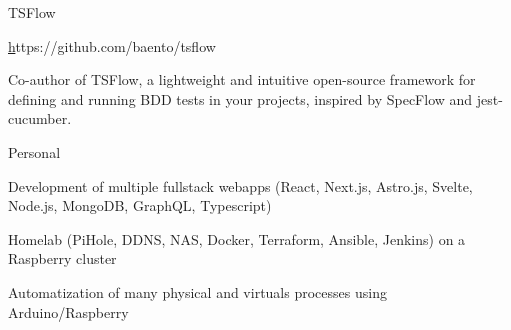
\begin{cventries}
    \cventrywithouttitleanddate
    {TSFlow} %
    {} %
    {
      \begin{cvitems} %
        \item {\href{https://github.com/baento/tsflow}https://github.com/baento/tsflow}
        \item {Co-author of TSFlow, a lightweight and intuitive open-source framework for defining and running BDD tests in your projects, inspired by SpecFlow and jest-cucumber.}
      \end{cvitems}
    }

  \cventry
    {} %
    {Personal} %
    {} %
    {} %
    {
      \begin{cvitems} %
        \item {Development of multiple fullstack webapps (React, Next.js, Astro.js, Svelte, Node.js, MongoDB, GraphQL, Typescript)}
        \item {Homelab (PiHole, DDNS, NAS, Docker, Terraform, Ansible, Jenkins) on a Raspberry cluster}
		\item {Automatization of many physical and virtuals processes using Arduino/Raspberry}
      \end{cvitems}
    }

\end{cventries}